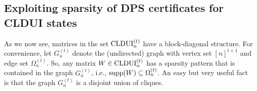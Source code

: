 \documentclass[11pt]{article}
\newcommand{\MV}{{\mathcal V}}
\newcommand{\MW}{{\mathcal W}}
\newcommand{\CLDUI}{\text{\rm CLDUI}}
\newcommand{\DPSt}{\mathrm{DPS}^{(t)}}
\newcommand{\ot}{\otimes}
\newcommand{\supp}{\text{\rm supp}}
\newcommand{\ui}{\underline{i}}
\newcommand{\uj}{\underline{j}}
\theoremstyle{plain}
\begin{document}





\subsection{Exploiting sparsity of DPS certificates for CLDUI states}\label{sec:DPS-CLDUIt-block}

As we now see, matrices in the set $\CLDUI^{(t)}_n$ have a block-diagonal structure. 
For convenience, let $G^{(t)}_n$ denote the (undirected) graph with vertex set $[n]^{t+1}$ and edge set $\Omega^{(t)}_n$. 
So, any matrix  $W\in \CLDUI^{(t)}_n$ has a sparsity pattern that is contained in the graph $G^{(t)}_n$, i.e., $\supp(W)\subseteq \Omega^{(t)}_n$.
An easy but very useful fact is that the graph $G^{(t)}_n$ is a disjoint union of cliques. 
\end{document}
